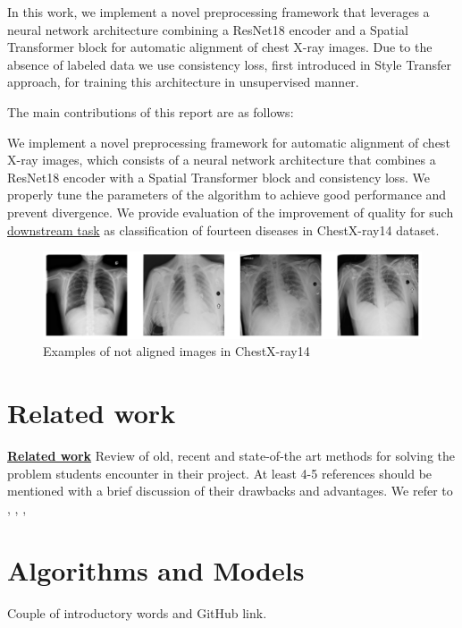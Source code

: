 \documentclass{article}
\begin{document}
In this work, we implement a novel preprocessing framework that leverages a 
 neural network architecture combining a ResNet18 encoder and a Spatial 
 Transformer block for automatic alignment of chest X-ray images. Due to the 
 absence of labeled data we use consistency loss, first introduced in Style 
 Transfer approach, for training this architecture in unsupervised manner.

The main contributions of this report are as follows:

We implement a novel preprocessing framework for automatic alignment of chest
 X-ray images, which consists of a neural network architecture that combines 
 a ResNet18 encoder with a Spatial Transformer block and consistency loss. 
We properly tune the parameters of the algorithm to achieve good performance
 and prevent divergence.
We provide evaluation of the improvement of quality for such 
 \href{https://paperswithcode.com/sota/multi-label-classification-on-chestx-ray14}{downstream task}
 as classification of fourteen diseases in ChestX-ray14 dataset.

\begin{figure}[ht]\label{icml-historical}
    \vskip 0.2in
    \begin{center}
    \centerline{\includegraphics[width=\columnwidth]{../images/initial_images.png}}
    \caption{Examples of not aligned images in ChestX-ray14}
    \end{center}
    \vskip -0.2in
\end{figure}

\section{Related work}\label{related_work}

\underline{\textbf{Related work}} Review of old, recent and state-of-the art methods
 for solving the problem students encounter in their project. At least 4-5 references should be mentioned with a brief discussion of their drawbacks and advantages. We refer to \cite{DataSet}, \cite{XRayDiagnosis}, \cite{SpatialTransform}, \cite{StyleTransfer}

\section{Algorithms and Models}\label{algorithms_and_models}
Couple of introductory words and GitHub link.
\end{document}
